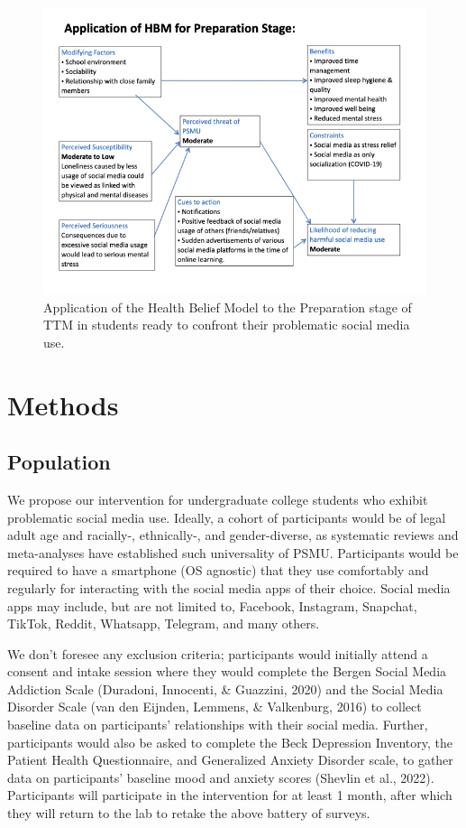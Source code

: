 \documentclass[
  man]{apa6}
\begin{document}
\begin{figure}
\centering
\includegraphics{hbmapplied.jpeg}
\caption{\label{fig:hbmapp}Application of the Health Belief Model to the Preparation stage of TTM in students ready to confront their problematic social media use.}
\end{figure}

\hypertarget{methods}{%
\section{Methods}\label{methods}}

\hypertarget{population}{%
\subsection{Population}\label{population}}

We propose our intervention for undergraduate college students who exhibit
problematic social media use. Ideally, a cohort of participants would be of
legal adult age and racially-,
ethnically-, and gender-diverse, as systematic reviews and meta-analyses have
established such universality of PSMU. Participants would be required to have
a smartphone (OS agnostic) that they use comfortably and regularly for interacting with the
social media apps of their choice. Social media apps may include, but are not
limited to, Facebook, Instagram, Snapchat, TikTok, Reddit, Whatsapp, Telegram,
and many others.

We don't foresee any exclusion criteria; participants
would initially attend a consent and intake session where they would complete
the Bergen Social Media Addiction Scale (Duradoni, Innocenti, \& Guazzini, 2020)
and the Social Media Disorder Scale (van den Eijnden, Lemmens, \& Valkenburg, 2016) to
collect baseline data on participants' relationships with their social media.
Further, participants would also be asked to complete the Beck Depression Inventory, the Patient Health Questionnaire, and Generalized Anxiety Disorder
scale, to gather data on participants' baseline mood and anxiety scores (Shevlin et al., 2022). Participants will participate in the
intervention for at least 1 month, after which they will return to the lab to
retake the above battery of surveys.
\end{document}
